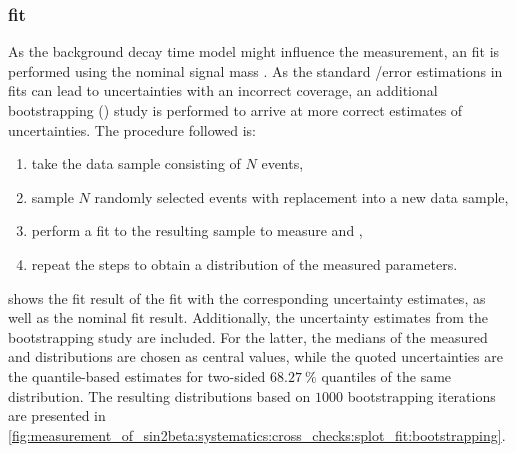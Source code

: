 \subsubsection{\sPlot fit}
\label{sec:measurement_of_sin2beta:systematics:cross_checks:splot_fit}
%
As the background decay time model might influence the measurement, an \sPlot fit is
performed using the nominal signal mass \PDF. As the standard \Minuit/\Hesse error
estimations in \sPlot fits can lead to uncertainties with an incorrect coverage,
an additional bootstrapping (\cf \eg \cite{Behnke:2013pga}) study is performed
to arrive at more correct estimates of uncertainties. The procedure followed is:
%
\begin{enumerate}
  \item take the \sweighted data sample consisting of $N$ events,
  \item sample $N$ randomly selected events with replacement into a new data sample,
  \item perform a fit to the resulting sample to measure \SJpsiKS and \CJpsiKS,
  \item repeat the steps to obtain a distribution of the measured \CP parameters.
\end{enumerate}
%
shows the fit result of the \sPlot fit with the corresponding \Hesse uncertainty
estimates, as well as the nominal fit result. Additionally, the uncertainty
estimates from the bootstrapping study are included. For the latter, the
medians of the measured \SJpsiKS and \CJpsiKS distributions are chosen as
central values, while the quoted uncertainties are the quantile-based estimates
for two-sided $\SI{68.27}{\percent}$ quantiles of the same distribution. The
resulting distributions based on $\num{1000}$ bootstrapping iterations are
presented in
\cref{fig:measurement_of_sin2beta:systematics:cross_checks:splot_fit:bootstrapping}.

